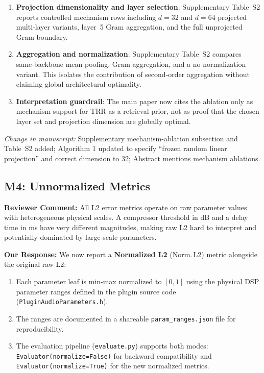 \documentclass[11pt]{article}
\newcommand{\reviewer}[1]{\textcolor{reviewercolor}{\textbf{Reviewer Comment:} #1}}
\newcommand{\response}[1]{\textcolor{responsecolor}{\textbf{Our Response:} #1}}
\newcommand{\change}[1]{\textit{Change in manuscript:} #1}
\begin{document}
\begin{enumerate}[leftmargin=*]
\item \textbf{Projection dimensionality and layer selection}: Supplementary Table~S2 reports controlled mechanism rows including $d{=}32$ and $d{=}64$ projected multi-layer variants, layer~5 Gram aggregation, and the full unprojected Gram boundary.
\item \textbf{Aggregation and normalization}: Supplementary Table~S2 compares same-backbone mean pooling, Gram aggregation, and a no-normalization variant. This isolates the contribution of second-order aggregation without claiming global architectural optimality.
\item \textbf{Interpretation guardrail}: The main paper now cites the ablation only as mechanism support for TRR as a retrieval prior, not as proof that the chosen layer set and projection dimension are globally optimal.
\end{enumerate}

\change{Supplementary mechanism-ablation subsection and Table~S2 added; Algorithm 1 updated to specify ``frozen random linear projection'' and correct dimension to 32; Abstract mentions mechanism ablations.}

\subsection*{M4: Unnormalized Metrics}

\reviewer{All L2 error metrics operate on raw parameter values with heterogeneous physical scales. A compressor threshold in dB and a delay time in ms have very different magnitudes, making raw L2 hard to interpret and potentially dominated by large-scale parameters.}

\response{We now report a \textbf{Normalized L2} (Norm.\,L2) metric alongside the original raw L2:}

\begin{enumerate}[leftmargin=*]
\item Each parameter leaf is min-max normalized to $[0,1]$ using the physical DSP parameter ranges defined in the plugin source code (\texttt{PluginAudioParameters.h}).
\item The ranges are documented in a shareable \texttt{param\_ranges.json} file for reproducibility.
\item The evaluation pipeline (\texttt{evaluate.py}) supports both modes: \texttt{Evaluator(normalize=False)} for backward compatibility and \texttt{Evaluator(normalize=True)} for the new normalized metrics.
\end{enumerate}
\end{document}
